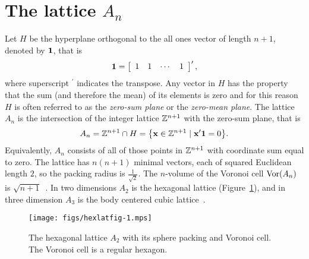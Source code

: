 \documentclass[journal]{IEEEtran}
\begin{document}
\section{The lattice $A_n$}\label{sec:lattice-a_n}
Let $H$ be the hyperplane orthogonal to the all ones vector of length $n+1$, denoted by $\boldsymbol{1}$, that is
\[
\boldsymbol{1} = \left[ \begin{array}{cccc} 1 & 1 & \cdots & 1 \end{array} \right]^\prime,
\]
where superscript $^\prime$ indicates the transpose.  Any vector in $H$ has the property that the sum (and therefore the mean) of its elements is zero and for this reason $H$ is often referred to as the \emph{zero-sum plane} or the \emph{zero-mean plane}.
The lattice $A_n$ is the intersection of the integer lattice ${\mathbb Z}^{n+1}$ with the zero-sum plane, that is
\begin{equation}
\label{eq:An_sub_Zn}
  A_{n} = \ints^{n+1} \cap H = \big\{ \xbf \in \ints^{n+1} \mid \dotprod{\xbf}{\onebf} = 0  \big\}.
\end{equation}
Equivalently, $A_n$ consists of all of those points in ${\mathbb Z}^{n+1}$ with coordinate sum equal to zero.
The lattice has $n(n+1)$ minimal vectors, each of squared Euclidean length $2$, so the packing radius is $\frac{1}{\sqrt{2}}$.  The $n$-volume of the Voronoi cell $\operatorname{Vor}(A_n)$ is $\sqrt{n+1}$~\cite[p. 108]{SPLAG}.  In two dimensions $A_2$ is the hexagonal lattice (Figure~\ref{fig:hexlatfig}), and in three dimension $A_3$ is the body centered cubic lattice~\cite[p. 108]{SPLAG}.  %

\begin{figure}[tbp]
	\centering
		\texttt{[image: figs/hexlatfig-1.mps]}
		\caption{The hexagonal lattice $A_2$ with its sphere packing and Voronoi cell.  The Voronoi cell is a regular hexagon.}
		\label{fig:hexlatfig}
\end{figure}
\end{document}
